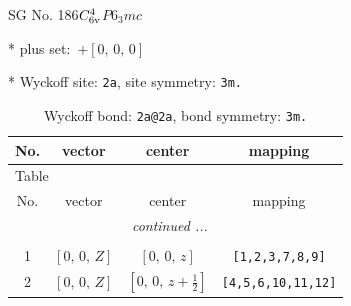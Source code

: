 \documentclass[fleqn,8pt]{jsarticle}
\begin{document}
\setcounter{MaxMatrixCols}{32}

\renewcommand{\tablename}{Table~}
\renewcommand{\figurename}{Figure~}
\begin{center}
\LARGE
SG No. 186\quad$C_{\rm 6v}^{4}$\quad$P6_3mc$\quad[ hexagonal ]
\end{center}

* plus set:\,\,\,$+\left[ 0,\, 0,\, 0 \right]$


* Wyckoff site: {\tt 2a}, site symmetry: {\tt 3m.}
\renewcommand{\arraystretch}{1.2}
\begin{longtable}{cccc}
\caption{Wyckoff bond: {\tt 2a@2a}, bond symmetry: {\tt 3m.}}
 \\
 \hline \hline
No. & vector & center & mapping \\ \hline \endfirsthead

\multicolumn{3}{l}{\tablename\ \thetable{}} \\
 \hline \hline
No. & vector & center & mapping \\ \hline \endhead

 \hline \hline
\multicolumn{3}{r}{\footnotesize\it continued ...} \\ \endfoot

 \hline \hline
\multicolumn{3}{r}{} \\ \endlastfoot

1 & $\left[ 0,\, 0,\, Z \right]$ & $\left[ 0,\, 0,\, z \right]$ & {\tt [1,2,3,7,8,9]} \\ \hline
2 & $\left[ 0,\, 0,\, Z \right]$ & $\left[ 0,\, 0,\, z + \frac{1}{2} \right]$ & {\tt [4,5,6,10,11,12]} \\
\end{longtable}
\renewcommand{\arraystretch}{1.2}
\end{document}
